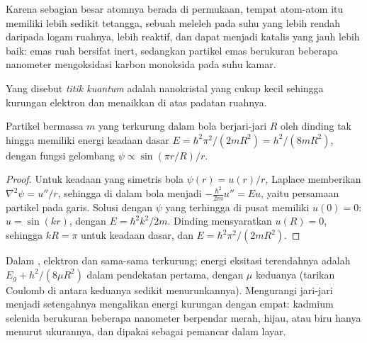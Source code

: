 Karena sebagian besar atomnya berada di permukaan, tempat atom-atom itu memiliki lebih sedikit
tetangga, sebuah  meleleh pada suhu yang lebih rendah daripada logam ruahnya,
lebih reaktif, dan dapat menjadi katalis yang jauh lebih baik: emas ruah bersifat inert, sedangkan
partikel emas berukuran beberapa nanometer mengoksidasi karbon monoksida pada suhu kamar.

\begin{definition}\label{def:b3:inorganic-materials:quantum-dot}
Yang disebut \emph{titik kuantum} adalah nanokristal  yang cukup kecil
sehingga kurungan elektron dan  menaikkan 
di atas  padatan ruahnya.
\end{definition}

\begin{theorem}\label{thm:b3:inorganic-materials:quantum-dot}
Partikel bermassa $m$ yang terkurung dalam bola berjari-jari $R$ oleh dinding tak hingga memiliki
energi keadaan dasar $E = \hbar^2\pi^2/(2mR^2) = h^2/(8mR^2)$, dengan fungsi gelombang $\psi \propto \sin(\pi r/R)/r$.
\end{theorem}

\begin{proof}
Untuk keadaan yang simetris bola $\psi(r) = u(r)/r$,  Laplace memberikan
$\nabla^2\psi = u''/r$, sehingga  di dalam bola menjadi $-\frac{\hbar^2}{2m}u'' = Eu$, yaitu persamaan partikel pada
garis. Solusi dengan $\psi$ yang terhingga di pusat memiliki $u(0) = 0$: $u = \sin(kr)$, dengan $E = \hbar^2k^2/2m$.
Dinding mensyaratkan $u(R) = 0$, sehingga $kR = \pi$ untuk keadaan dasar, dan $E = \hbar^2\pi^2/(2mR^2)$.
\end{proof}

Dalam , elektron dan  sama-sama terkurung; energi
eksitasi terendahnya adalah $E_g + h^2/(8\mu R^2)$ dalam pendekatan pertama, dengan $\mu$ 
keduanya (tarikan Coulomb di antara keduanya sedikit menurunkannya). Mengurangi jari-jari menjadi setengahnya
mengalikan energi kurungan dengan empat:  kadmium selenida berukuran beberapa
nanometer berpendar merah, hijau, atau biru hanya menurut ukurannya, dan dipakai sebagai
pemancar dalam layar.

